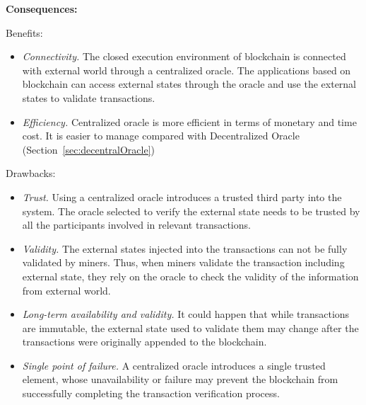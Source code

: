 

\vspace{0.5em}\noindent \textbf{Consequences:} 

Benefits:
\begin{itemize}
  \item \textit{Connectivity.} The closed execution environment of blockchain is connected with external world through a centralized oracle. The applications based on blockchain can access external states through the oracle and use the external states to validate transactions.
  \item \textit{Efficiency.} Centralized oracle is more efficient in terms of monetary and time cost. It is easier to manage compared with Decentralized Oracle (Section~\ref{sec:decentralOracle})
\end{itemize}

Drawbacks: 
\begin{itemize}
   \item \textit{Trust.} Using a centralized oracle introduces a trusted third party into the system. The oracle selected to verify the external state needs to be trusted by all the participants involved in relevant transactions.  
   \item \textit{Validity.} The external states injected into the transactions can not be fully validated by miners. Thus, when miners validate the transaction including external state, they rely on the oracle to check the validity of the information from external world. 
   \item \textit{Long-term availability and validity.}
   It could happen that while transactions are immutable, the external state used to validate them may change after the transactions were originally appended to the blockchain. 
   \item \textit{Single point of failure.} A centralized oracle introduces a single trusted element, whose unavailability or failure may prevent the blockchain from successfully completing the transaction verification process.
\end{itemize}

